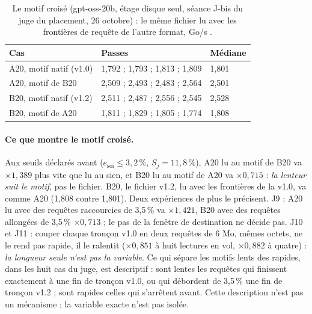 \begin{table}[ht]
\centering\small
\caption[Le motif croisé]{Le motif croisé (gpt-oss-20b, étage disque seul, séance J-bis du juge du placement, 26 octobre) : le même fichier lu avec les frontières de requête de l'autre format, Go/s \mes.}
\label{t3cod:tab:motif}
\begin{tabular}{@{}lll@{}}
\toprule
Cas & Passes & Médiane \\
\midrule
A20, motif natif (v1.0) & 1,792 ; 1,793 ; 1,813 ; 1,809 & 1,801 \\
A20, motif de B20 & 2,509 ; 2,493 ; 2,483 ; 2,564 & 2,501 \\
B20, motif natif (v1.2) & 2,511 ; 2,487 ; 2,556 ; 2,545 & 2,528 \\
B20, motif de A20 & 1,811 ; 1,829 ; 1,805 ; 1,774 & 1,808 \\
\bottomrule
\end{tabular}
\end{table}

\paragraph{Ce que montre le motif croisé.} Aux seuils déclarés avant ($e_{\text{soi}} \le 3{,}2\,\%$, $S_j = 11{,}8\,\%$), A20 lu au motif de B20 va $\times 1{,}389$ plus vite que lu au sien, et B20 lu au motif de A20 va $\times 0{,}715$ : \emph{la lenteur suit le motif}, pas le fichier. B20, le fichier v1.2, lu avec les frontières de la v1.0, va comme A20 (1,808 contre 1,801). Deux expériences de plus le précisent. J9 : A20 lu avec des requêtes raccourcies de 3,5\,\% va $\times 1{,}421$, B20 avec des requêtes allongées de 3,5\,\% $\times 0{,}713$ ; le pas de la fenêtre de destination ne décide pas. J10 et J11 : couper chaque tronçon v1.0 en deux requêtes de 6 Mo, mêmes octets, ne le rend pas rapide, il le ralentit ($\times 0{,}851$ à huit lectures en vol, $\times 0{,}882$ à quatre) : \emph{la longueur seule n'est pas la variable}. Ce qui sépare les motifs lents des rapides, dans les huit cas du juge, est descriptif : sont lentes les requêtes qui finissent exactement à une fin de tronçon v1.0, ou qui débordent de 3,5\,\% une fin de tronçon v1.2 ; sont rapides celles qui s'arrêtent avant. Cette description n'est pas un mécanisme ; la variable exacte n'est pas isolée.

\begin{figure}[tbp]
\centering
\GrapheCodonJalonBis
{}
\label{fig:t3-codon-jalon-bis}
\end{figure}

